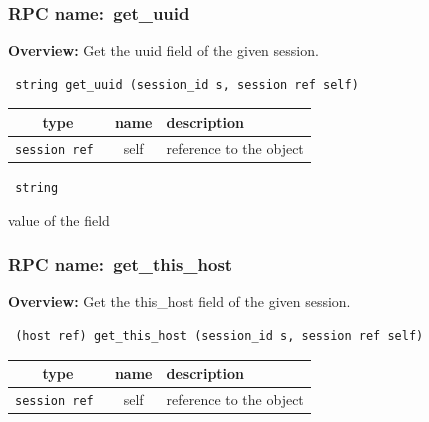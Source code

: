 \vspace{0.3cm}
\vspace{0.3cm}
\vspace{0.3cm}
\subsubsection{RPC name:~get\_uuid}

{\bf Overview:} 
Get the uuid field of the given session.

\begin{verbatim} string get_uuid (session_id s, session ref self)\end{verbatim}



 
\vspace{0.3cm}
\begin{tabular}{|c|c|p{7cm}|}
 \hline
{\bf type} & {\bf name} & {\bf description} \\ \hline
{\tt session ref } & self & reference to the object \\ \hline 

\end{tabular}

\vspace{0.3cm}

{\tt 
string
}


value of the field
\vspace{0.3cm}
\vspace{0.3cm}
\vspace{0.3cm}
\subsubsection{RPC name:~get\_this\_host}

{\bf Overview:} 
Get the this\_host field of the given session.

\begin{verbatim} (host ref) get_this_host (session_id s, session ref self)\end{verbatim}



 
\vspace{0.3cm}
\begin{tabular}{|c|c|p{7cm}|}
 \hline
{\bf type} & {\bf name} & {\bf description} \\ \hline
{\tt session ref } & self & reference to the object \\ \hline 

\end{tabular}

